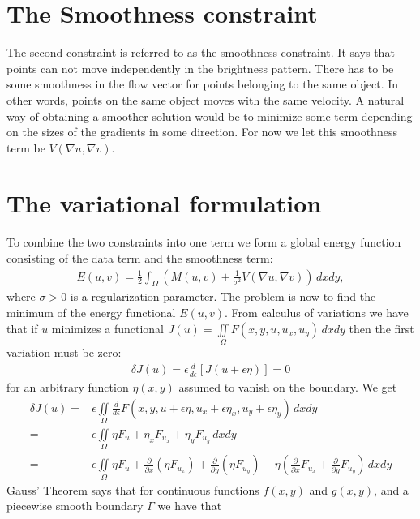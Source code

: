\documentclass[10pt,a4paper]{article}
\begin{document}
\section{The Smoothness constraint}
The second constraint is referred to as the smoothness constraint. It says that points can not move independently in the brightness pattern. There has to be some smoothness in the flow vector for points belonging to the same object. In other words, points on the same object moves with the same velocity. A natural way of obtaining a smoother solution would be to minimize some term depending on the sizes of the gradients in some direction. For now we let this smoothness term be $V(\nabla u, \nabla v)$.

\section{The variational formulation}
To combine the two constraints into one term we form a global energy function consisting of the data term and the smoothness term:
\begin{align}
E(u,v) = \frac{1}{2} \int_\Omega (M(u,v) + \frac{1}{\sigma^2} V(\nabla u, \nabla v)) \, dx dy,
\end{align}
where $\sigma > 0$ is a regularization parameter. The problem is now to find the minimum of the energy functional $E(u,v)$. From calculus of variations we have that if $u$ minimizes a functional $J(u) = \iint \limits_\Omega F(x,y,u,u_x,u_y) \, dxdy$ then the first variation must be zero:
\begin{align*}
\delta J(u) = \epsilon \frac{d}{d \epsilon} \left[ J(u + \epsilon \eta) \right] = 0 
\end{align*}
for an arbitrary function $\eta(x,y)$ assumed to vanish on the boundary. We get
\begin{align*}
\delta J(u) =& \epsilon \iint \limits_{\Omega} \frac{d}{d \epsilon} F(x,y,u + \epsilon \eta, u_x + \epsilon \eta_x, u_y + \epsilon \eta_y) \, dxdy \\
=& \epsilon \iint \limits_{\Omega} \eta F_u + \eta_x F_{u_x} + \eta_y F_{u_y} \, dxdy \\
=& \epsilon \iint \limits_{\Omega} \eta F_u + \frac{\partial}{\partial x} (\eta F_{u_x}) + \frac{\partial }{\partial y} (\eta F_{u_y}) - \eta \left( \frac{\partial}{\partial x} F_{u_x} + \frac{\partial }{\partial y} F_{u_y} \right) \, dxdy
\end{align*}
Gauss' Theorem says that for continuous functions $f(x,y)$ and $g(x,y)$, and a piecewise smooth boundary $\Gamma$ we have that 
\end{document}
